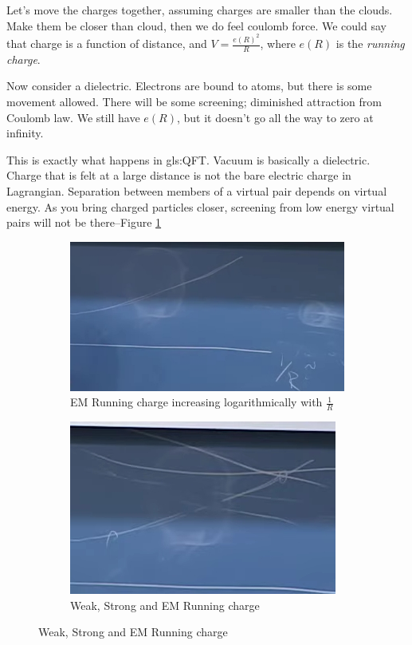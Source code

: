 \documentclass[]{article}
\begin{document}
Let's move the charges together, assuming charges are smaller than the clouds. Make them be closer than cloud, then we do feel coulomb force. We could say that charge is a function of distance, and $V=\frac{e(R)^2}{R}$, where $e(R)$ is the \emph{running charge}.

Now consider a dielectric. Electrons are bound to atoms, but there is some movement allowed. There will be some screening; diminished attraction from Coulomb law. We still have $e(R)$, but it doesn't go all the way to zero at infinity.

This is exactly what happens in \gls{gls:QFT}. Vacuum is basically a dielectric. Charge that is felt at a large distance is not the bare electric charge in Lagrangian. Separation between members of a virtual pair depends on virtual energy. As you bring charged particles closer, screening from low energy virtual pairs will not be there--Figure \ref{fig:2-10-effective-charge}

\begin{figure}[H]
	\caption{Running charges}
	\begin{subfigure}[t]{0.45\textwidth}
		\caption{EM Running charge increasing logarithmically with $\frac{1}{R}$}\label{fig:2-10-effective-charge}
		\includegraphics[width=\textwidth]{2-10-effective-charge}
	\end{subfigure}
	\begin{subfigure}[t]{0.45\textwidth}
		\caption{Weak, Strong and EM Running charge}\label{fig:2-10-effective-charge-esw}
		\includegraphics[width=\textwidth]{2-10-effective-charge-esw}
	\end{subfigure}
\end{figure}
\end{document}
